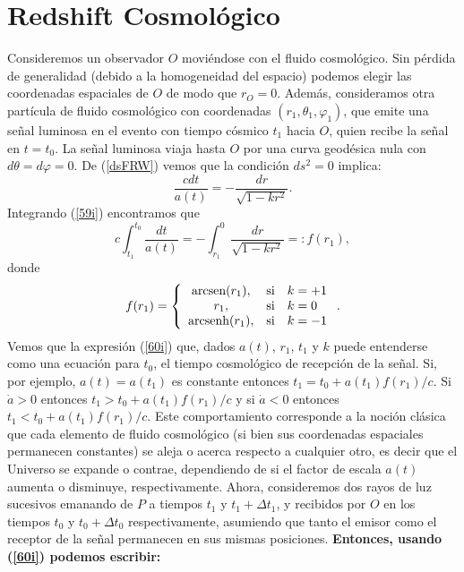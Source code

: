 \section{Redshift Cosmológico}
Consideremos un observador $O$ moviéndose con el fluido cosmológico. Sin pérdida de generalidad (debido a la
homogeneidad del espacio) podemos elegir las coordenadas espaciales de $O$ de modo que $r_O=0$. Además, consideramos 
otra partícula de fluido cosmológico con coordenadas $(r_1,\theta_1,\varphi_1)$, que emite una señal luminosa en el
evento con tiempo cósmico $t_1$ hacia $O$, quien recibe la señal en $t=t_0$. La señal luminosa viaja hasta $O$ por 
una curva geodésica nula con $d\theta=d\varphi=0$. De (\ref{dsFRW}) vemos que la condición $ds^2=0$ implica:
\begin{equation}
\frac{cdt}{a(t)}=-\frac{dr}{\sqrt{1-kr^2}}. \label{59i}
\end{equation}
Integrando (\ref{59i}) encontramos que
\begin{equation}
c\int_{t_1}^{t_0}\frac{dt}{a(t)}=-\int_{r_1}^{0}\frac{dr}{\sqrt{1-kr^2}}=:f(r_1), \label{60i}%
\end{equation}
donde
\begin{equation}
f(r_1)=\left\{
\begin{array}
[c]{ccl}%
\text{arcsen}(r_1), &\text{si}& k=+1\\
r_1, &\text{si}& k=0\\
\text{arcsenh} (r_1), &\text{si}& k=-1
\end{array}
\right. . \label{61i}%
\end{equation}
Vemos que la expresión (\ref{60i}) que, dados $a(t)$, $r_1$, $t_1$ y $k$ puede entenderse como 
una ecuación para $t_0$, el tiempo cosmológico de recepción de la señal. Si, por ejemplo, $a(t)=a(t_1)$ es 
constante entonces $t_1=t_0+a(t_1)f(r_1)/c$. Si $\dot{a}>0$ entonces $t_1>t_0+a(t_1)f(r_1)/c$ y si $\dot{a}<0$ 
entonces $t_1<t_0+a(t_1)f(r_1)/c$. Este comportamiento corresponde a la noción clásica que cada elemento de 
fluido cosmológico (si bien sus coordenadas espaciales permanecen constantes) se aleja o acerca respecto a cualquier 
otro, es decir que el Universo se expande o contrae, dependiendo de si el factor de escala $a(t)$ aumenta o disminuye, 
respectivamente.
Ahora, consideremos dos rayos de luz sucesivos emanando de $P$ a tiempos
$t_1$ y $t_1+\Delta t_1$, y recibidos por $O$ en los tiempos $t_0$ y
$t_0+\Delta t_0$ respectivamente, asumiendo que tanto el emisor como el receptor  de la señal permanecen en sus
mismas posiciones. \textbf{Entonces, usando (\ref{60i}) podemos escribir:}
